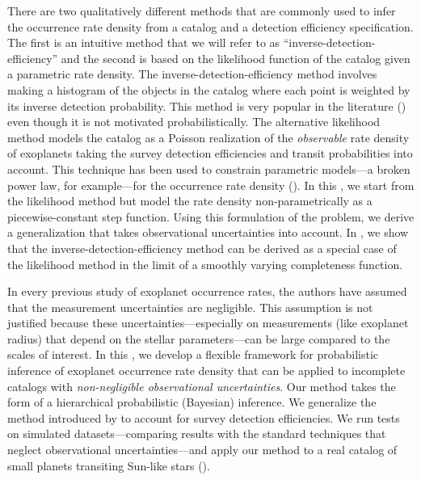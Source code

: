 There are two qualitatively different methods that are commonly used to infer
the occurrence rate density from a catalog and a detection efficiency
specification.
The first is an intuitive method that we will refer to as
``inverse-detection-efficiency'' and the second is based on the likelihood
function of the catalog given a parametric rate density.
The inverse-detection-efficiency method involves making a histogram of the
objects in the catalog where each point is weighted by its inverse detection
probability.
This method is very popular in the literature (\citealt{Howard:2012,
Dong:2013, Dressing:2013, Swift:2013, Petigura:2013}) even though it is not
motivated probabilistically.
The alternative likelihood method models the catalog as a Poisson realization
of the \emph{observable} rate density of exoplanets taking the survey
detection efficiencies and transit probabilities into account.
This technique has been used to constrain parametric models---a broken power
law, for example---for the occurrence rate density (\citealt{Tabachnik:2002,
Youdin:2011, Dong:2013}).
In this \paper, we start from the likelihood method but model the rate density
non-parametrically as a piecewise-constant step function.
Using this formulation of the problem, we derive a generalization that takes
observational uncertainties into account.
In , we show that the inverse-detection-efficiency method can
be derived as a special case of the likelihood method in the limit of a
smoothly varying completeness function.

In every previous study of exoplanet occurrence rates, the authors have
assumed that the measurement uncertainties are negligible.
This assumption is not justified because these uncertainties---especially on
measurements (like exoplanet radius) that depend on the stellar
parameters---can be large compared to the scales of interest.
In this \paper, we develop a flexible framework for probabilistic inference of
exoplanet occurrence rate density that can be applied to incomplete catalogs
with \emph{non-negligible observational uncertainties}.
Our method takes the form of a hierarchical probabilistic (Bayesian)
inference.
We generalize the method introduced by \citet{Hogg:2010a} to account for survey
detection efficiencies.
We run tests on simulated datasets---comparing results with the standard
techniques that neglect observational uncertainties---and apply our method to
a real catalog of small planets transiting Sun-like stars
(\citealt{Petigura:2013}).

